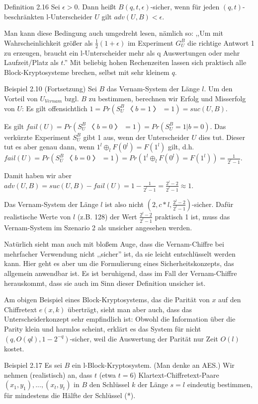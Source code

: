 \documentclass[a4paper]{article}
\begin{document}
\begin{multicols}{3}
Definition 2.16 Sei $\epsilon>0$. Dann heißt $B(q,t,\epsilon)$-sicher, wenn für jeden $(q,t)$-beschränkten l-Unterscheider $U$ gilt $adv(U,B)< \epsilon$.

Man kann diese Bedingung auch umgedreht lesen, nämlich so: ,,Um mit Wahrscheinlichkeit größer als $\frac{1}{2}(1 +\epsilon)$ im Experiment $G^B_U$ die richtige Antwort 1 zu erzeugen, braucht ein l-Unterscheider mehr als q Auswertungen oder mehr Laufzeit/Platz als $t$.''  Mit beliebig hohen Rechenzeiten lassen sich praktisch alle Block-Kryptosysteme brechen, selbst mit sehr kleinem $q$.

Beispiel 2.10 (Fortsetzung) Sei $B$ das Vernam-System der Länge $l$. Um den Vorteil von $U_{Vernam}$ bzgl. $B$ zu bestimmen, berechnen wir Erfolg und Misserfolg von $U$: Es gilt offensichtlich $1=Pr(S^B_U〈b= 1〉= 1) = suc(U,B)$.

Es gilt $fail(U) = Pr(S^B_U〈b= 0〉= 1) = Pr(S_U^B= 1|b= 0)$. Das verkürzte Experiment $S_U^B$ gibt 1 aus, wenn der Unterscheider $U$ dies tut. Dieser tut es aber genau dann, wenn $1^l\oplus_l F(0^l) =F(1^l)$ gilt, d.h. $fail(U) = Pr(S_U^B〈b= 0〉= 1) = Pr(1^l\oplus_l F(0^l) =F(1^l)) = \frac{1}{2^l- 1}$.

Damit haben wir aber $adv(U,B) = suc(U,B)-fail(U) = 1-\frac{1}{2^l- 1}=\frac{2^l-2}{2^l-1}\approx 1$.

Das Vernam-System der Länge $l$ ist also nicht $(2,c*l,\frac{2^l- 2}{2^l- 1})$-sicher. Dafür realistische Werte von $l$ (z.B. 128) der Wert $\frac{2^l-2}{2^l-1}$ praktisch 1 ist, muss das Vernam-System im Szenario 2 als unsicher angesehen werden.

Natürlich sieht man auch mit bloßem Auge, dass die Vernam-Chiffre bei mehrfacher Verwendung nicht ,,sicher'' ist, da sie leicht entschlüsselt werden kann. Hier geht es aber um die Formulierung eines Sicherheitskonzepts, das allgemein anwendbar ist. Es ist beruhigend, dass im Fall der Vernam-Chiffre herauskommt, dass sie auch im Sinn dieser Definition unsicher ist.

Am obigen Beispiel eines Block-Kryptosystems, das die Parität von $x$ auf den Chiffretext $e(x,k)$ überträgt, sieht man aber auch, dass das Unterscheiderkonzept sehr empfindlich ist: Obwohl die Information über die Parity klein und harmlos scheint, erklärt es das System für nicht $(q,O(ql), 1-2^{-q})$-sicher, weil die Auswertung der Parität nur Zeit $O(l)$ kostet.

Beispiel 2.17 Es sei $B$ ein l-Block-Kryptosystem. (Man denke an AES.) Wir nehmen (realistisch) an, dass $t$ (etwa $t=6$) Klartext-Chiffretext-Paare $(x_1,y_1),...,(x_t,y_t)$ in $B$ den Schlüssel $k$ der Länge $s=l$ eindeutig bestimmen, für mindestens die Hälfte der Schlüssel (*).


\end{multicols}
\end{document}
